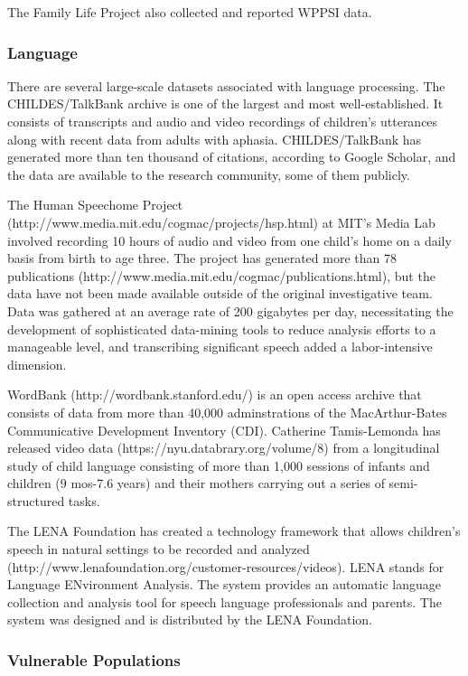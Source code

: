 \documentclass[letterpaper,man,apacite]{apa6}
\begin{document}
The Family Life Project also collected and reported WPPSI data.

\subsubsection{Language}

There are several large-scale datasets associated with language processing.
The CHILDES/TalkBank \cite{macwhinney_childes_2001} archive is one of the largest and most well-established.
It consists of transcripts and audio and video recordings of children's utterances along with recent data from adults with aphasia.
CHILDES/TalkBank has generated more than ten thousand of citations, according to Google Scholar, and the data are available to the research community, some of them publicly.

The Human Speechome Project (http://www.media.mit.edu/cogmac/projects/hsp.html) at MIT's Media Lab involved recording 10 hours of audio and video from one child's home on a daily basis from birth to age three.
The project has generated more than 78 publications (http://www.media.mit.edu/cogmac/publications.html), but the data have not been made available outside of the original investigative team.
Data was gathered at an average rate of 200 gigabytes per day, necessitating the development of sophisticated data-mining tools to reduce analysis efforts to a manageable level, and transcribing significant speech added a labor-intensive dimension.

WordBank (http://wordbank.stanford.edu/) is an open access archive that consists of data from more than 40,000 adminstrations of the MacArthur-Bates Communicative Development Inventory (CDI).
Catherine Tamis-Lemonda has released video data (https://nyu.databrary.org/volume/8) from a longitudinal study of child language consisting of more than 1,000 sessions of infants and children (9 mos-7.6 years) and their mothers carrying out a series of semi-structured tasks.

The LENA Foundation has created a technology framework that allows children's speech in natural settings to be recorded and analyzed (http://www.lenafoundation.org/customer-resources/videos).
LENA stands for Language ENvironment Analysis.
The system provides an automatic language collection and analysis tool for speech language professionals and parents.
The system was designed and is distributed by the LENA Foundation.

\subsubsection{Vulnerable Populations}
\end{document}
